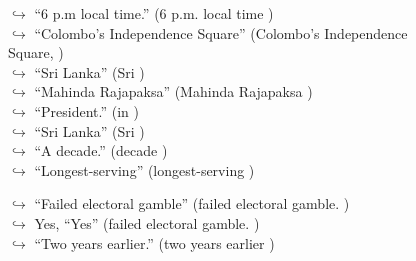 \documentclass[11pt,a4paper, onecolumn]{article}
\begin{document}
\begin{figure}[t] \small \begin{tcolorbox}[boxsep=0pt,left=5pt,right=0pt,top=2pt,colback = yellow!5] \begin{dialogue}
 \small 
\colorbox{pink!25}{$\hookrightarrow$}
{ ``6 p.m local time.'' (6 p.m. local time ) }
\\
\colorbox{pink!25}{$\hookrightarrow$}
{ ``Colombo's Independence Square'' (Colombo's Independence Square, ) }
\\
\colorbox{pink!25}{$\hookrightarrow$}
{ ``Sri Lanka'' (Sri ) }
\\
\colorbox{pink!25}{$\hookrightarrow$}
{ ``Mahinda Rajapaksa'' (Mahinda Rajapaksa ) }
\\
\colorbox{pink!25}{$\hookrightarrow$}
{ ``President.'' (in ) }
\\
\colorbox{pink!25}{$\hookrightarrow$}
{ ``Sri Lanka'' (Sri ) }
\\
\colorbox{pink!25}{$\hookrightarrow$}
{ ``A decade.'' (decade ) }
\\
\colorbox{pink!25}{$\hookrightarrow$}
{ ``Longest-serving'' (longest-serving ) }
 \end{dialogue}\end{tcolorbox}\end{figure}\begin{figure}[t] \small \begin{tcolorbox}[boxsep=0pt,left=5pt,right=0pt,top=2pt,colback = yellow!5] \begin{dialogue}
 \small 
\colorbox{pink!25}{$\hookrightarrow$}
{ ``Failed electoral gamble'' (failed electoral gamble. ) }
\\
\colorbox{pink!25}{$\hookrightarrow$}
\colorbox{red!25}{Yes,}
{ ``Yes'' (failed electoral gamble. ) }
\\
\colorbox{pink!25}{$\hookrightarrow$}
{ ``Two years earlier.'' (two years earlier ) }

\end{dialogue}
\end{tcolorbox}
\end{figure}
\end{document}

